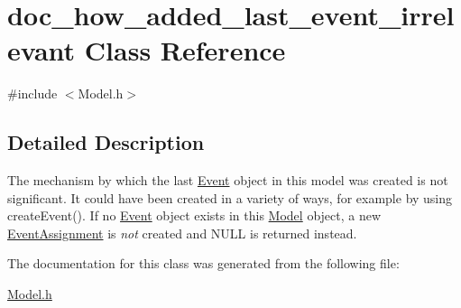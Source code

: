 \hypertarget{classdoc__how__added__last__event__irrelevant}{}\section{doc\+\_\+how\+\_\+added\+\_\+last\+\_\+event\+\_\+irrelevant Class Reference}
\label{classdoc__how__added__last__event__irrelevant}


{\ttfamily \#include $<$Model.\+h$>$}



\subsection{Detailed Description}
\begin{DoxyParagraph}{}
The mechanism by which the last \hyperlink{class_event}{Event} object in this model was created is not significant. It could have been created in a variety of ways, for example by using create\+Event(). If no \hyperlink{class_event}{Event} object exists in this \hyperlink{class_model}{Model} object, a new \hyperlink{class_event_assignment}{Event\+Assignment} is {\itshape not} created and {\ttfamily N\+U\+LL} is returned instead. 
\end{DoxyParagraph}


The documentation for this class was generated from the following file\+:\begin{DoxyCompactItemize}
\item 
\hyperlink{_model_8h}{Model.\+h}\end{DoxyCompactItemize}
